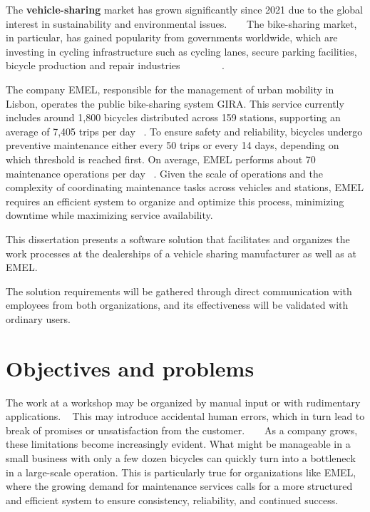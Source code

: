 The \textbf{vehicle-sharing} market has grown significantly since 2021 due to the global interest in sustainability and environmental issues. ~\cite{cohesionOpenData} ~\cite{bike_data_businessresearch}
The bike-sharing market, in particular, has gained popularity from governments worldwide, which are investing in cycling infrastructure such as cycling lanes, secure parking facilities, bicycle production and repair industries ~\cite{Clercq2023} ~\cite{Cerro2024} ~\cite{European_declararion_on_cycling} ~\cite{bike_data_businessresearch} ~\cite{cohesionOpenData}.

The company \ac{EMEL}, responsible for the management of urban mobility in Lisbon, operates the public bike-sharing system GIRA. This service currently includes around 1,800 bicycles distributed across 159 stations, supporting an average of 7,405 trips per day ~\cite{Gira_Trips}. To ensure safety and reliability, bicycles undergo preventive maintenance either every 50 trips or every 14 days, depending on which threshold is reached first. On average, \ac{EMEL} performs about 70 maintenance operations per day ~\cite{Gira_Maintenance}. Given the scale of operations and the complexity of coordinating maintenance tasks across vehicles and stations, \ac{EMEL} requires an efficient system to organize and optimize this process, minimizing downtime while maximizing service availability.

This dissertation presents a software solution that facilitates and organizes the work processes at the dealerships of a vehicle sharing manufacturer as well as at \ac{EMEL}. 

The solution requirements will be gathered through direct communication with employees from both organizations, and its effectiveness will be validated with ordinary users.


\section{Objectives and problems}

The work at a workshop may be organized by manual input or with rudimentary applications. ~\cite{MAS_MOTORS} 
This may introduce accidental human errors, which in turn lead to break of promises or unsatisfaction from the customer. ~\cite{MAS_MOTORS} ~\cite{Setting_the_after_sale_process}
As a company grows, these limitations become increasingly evident. What might be manageable in a small business with only a few dozen bicycles can quickly turn into a bottleneck in a large-scale operation. This is particularly true for organizations like \ac{EMEL}, where the growing demand for maintenance services calls for a more structured and efficient system to ensure consistency, reliability, and continued success.


